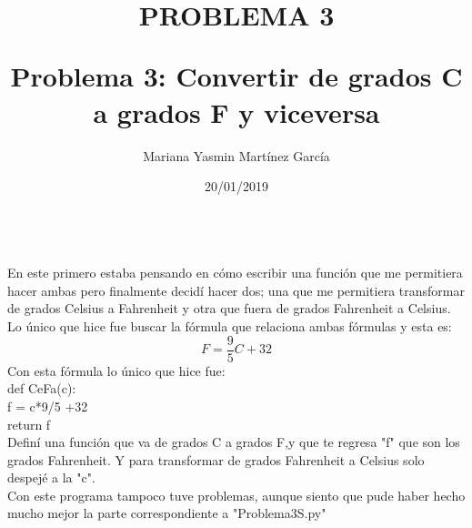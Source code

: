 \documentclass{article}
\title{\Huge\item\color{orange}\textbf{PROBLEMA 3 }}
\author{\Large Mariana Yasmin Martínez García}
\date{\Large 20/01/2019}
\begin{document}
\begin{figure}[t]
	\centering
	\caption{}
	\label{fig:1}
\end{figure}





	\maketitle
		
	\newpage
	
	\title{\huge\textbf{Problema 3: Convertir de grados C a  grados F y viceversa }} \\
	En este primero estaba pensando en cómo escribir una función que me permitiera hacer ambas pero finalmente decidí hacer dos; una que me permitiera transformar de grados Celsius a Fahrenheit y otra que fuera de grados Fahrenheit a Celsius. \\
	Lo único que hice fue buscar la fórmula que relaciona ambas fórmulas y esta es: \[ F = \frac{9}{5} C +32 \]
	Con esta fórmula lo único que hice fue:\\
	def CeFa(c): \\
		f = c*9/5 +32\\
		return f\\
	Definí una función que va de grados C a grados F,y que te regresa "f" que son los grados Fahrenheit. Y para transformar de grados Fahrenheit a Celsius solo despejé a la "c".\\
	Con este programa tampoco tuve problemas, aunque siento que pude haber hecho mucho mejor la parte correspondiente a "Problema3S.py"
\end{document}
